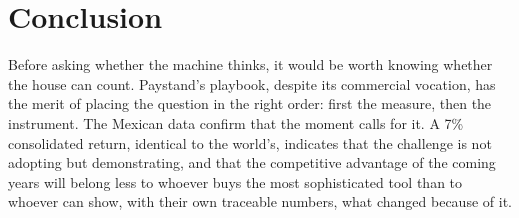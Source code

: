\documentclass[11pt,a4paper]{article}
\begin{document}
\section{Conclusion}

Before asking whether the machine thinks, it would be worth knowing whether the house can count. Paystand's playbook, despite its commercial vocation, has the merit of placing the question in the right order: first the measure, then the instrument. The Mexican data confirm that the moment calls for it. A 7\% consolidated return, identical to the world's, indicates that the challenge is not adopting but demonstrating, and that the competitive advantage of the coming years will belong less to whoever buys the most sophisticated tool than to whoever can show, with their own traceable numbers, what changed because of it.
\end{document}
